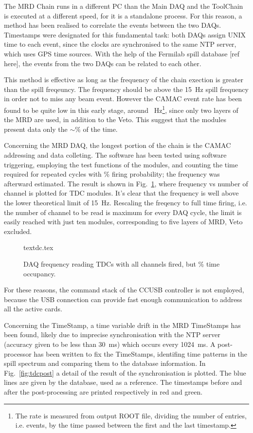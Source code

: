 The MRD Chain runs in a different PC than the Main DAQ and the ToolChain %
is executed at a different speed, for it is a standalone process.
For this reason, a method has been realised to correlate the events between the two DAQs.
Timestamps were designated for this fundamental task: both DAQs assign UNIX time to each event, since %
the clocks are synchronised to the same NTP server, which uses GPS time sources.
With the help of the Fermilab spill database [ref here], the events from the two DAQs can be related %
to each other.

This method is effective as long as the frequency of the chain exection is greater than the %
spill freqeuncy.
The frequency should be above the 15~Hz spill frequency in order not to miss any beam event.
However the CAMAC event rate has been found to be quite low in this %
early stage, around ~Hz\footnote{The rate is measured from output ROOT file, dividing %
  the number of entries, i.e. events, by the time passed between the first and the last timestamp.}, %
since only two layers of the MRD are used, in addition to the Veto.
This suggest that the modules present data only the $\sim$\% of the time.

Concerning the MRD DAQ, the longest portion of the chain is the CAMAC addressing and data colleting.
The software has been tested using software triggering, employing the test functions of the modules, %
and counting the time required for  repeated cycles with \% firing probability; %
the frequency was afterward estimated.
The result is shown in Fig.~\ref{fig:tdcfreq}, where frequency vs number of channel is %
plotted for TDC modules.
It's clear that the frequency is well above the lower theoretical limit of 15~Hz.
Rescaling the freqency to full time firing, i.e. the number of channel to be read is maximum %
for every DAQ cycle, the limit is easily reached with just ten modules, corresponding %
to five layers of MRD, Veto excluded.

\begin{figure}
  \centering
  {textdc.tex}
    \caption{DAQ frequency reading TDCs with all channels fired, but \% time occupancy.}
  \label{fig:tdcfreq}
\end{figure}

For these reasons, the command stack of the CCUSB controller is not employed, %
because the USB connection can provide fast enough communication to address all the active cards.

Concerning the TimeStamp, a time variable drift in the MRD TimeStamps has been found, %
likely due to imprecise synchronisation with the NTP server %
(accuracy given to be less than 30~ms) which occurs every 1024~ms. 
A post-processor has been written to fix the TimeStamps, identifing time patterns in the %
spill spectrum and comparing them to the database information.
In Fig.~\ref{fig:tdcpost} a detail of the result of the synchronisation is plotted.
The blue lines are given by the database, used as a reference.
The timestamps before and after the post-processing are printed respectively in red and green.


